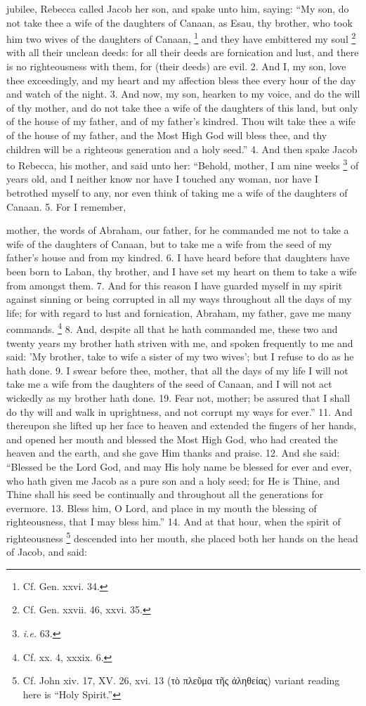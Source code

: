 jubilee, Rebecca called Jacob her son, and spake unto him, saying: ``My son, do not take thee a wife of the daughters of Canaan, as Esau, thy brother, who took him two wives of the daughters of Canaan, \footnote{Cf. Gen. xxvi. 34.} and they have embittered my soul \footnote{Cf. Gen. xxvii. 46, xxvi. 35.} with all their unclean deeds: for all their deeds are fornication and lust, and there is no righteousness with them, for (their deeds) are evil. 2. And I, my son, love thee exceedingly, and my heart and my affection bless thee every hour of the day and watch of the night. 3. And now, my son, hearken to my voice, and do the will of thy mother, and do not take thee a wife of the daughters of this land, but only of the house of my father, and of my father's kindred. Thou wilt take thee a wife of the house of my father, and the Most High God will bless thee, and thy children will be a righteous generation and a holy seed.'' 4. And then spake Jacob to Rebecca, his mother, and said unto her: ``Behold, mother, I am nine weeks \footnote{\emph{i.e.} 63.} of years old, and I neither know nor have I touched any woman, nor have I betrothed myself to any, nor even think of taking me a wife of the daughters of Canaan. 5. For I remember,

mother, the words of Abraham, our father, for he commanded me not to take a wife of the daughters of Canaan, but to take me a wife from the seed of my father's house and from my kindred. 6. I have heard before that daughters have been born to Laban, thy brother, and I have set my heart on them to take a wife from amongst them. 7. And for this reason I have guarded myself in my spirit against sinning or being corrupted in all my ways throughout all the days of my life; for with regard to lust and fornication, Abraham, my father, gave me many commands. \footnote{Cf. xx. 4, xxxix. 6.} 8. And, despite all that he hath commanded me, these two and twenty years my brother hath striven with me, and spoken frequently to me and said: 'My brother, take to wife a sister of my two wives'; but I refuse to do as he hath done. 9. I swear before thee, mother, that all the days of my life I will not take me a wife from the daughters of the seed of Canaan, and I will not act wickedly as my brother hath done. 19. Fear not, mother; be assured that I shall do thy will and walk in uprightness, and not corrupt my ways for ever.'' 11. And thereupon she lifted up her face to heaven and extended the fingers of her hands, and opened her mouth and blessed the Most High God, who had created the heaven and the earth, and she gave Him thanks and praise. 12. And she said: ``Blessed be the Lord God, and may His holy name be blessed for ever and ever, who hath given me Jacob as a pure son and a holy seed; for He is Thine, and Thine shall his seed be continually and throughout all the generations for evermore. 13. Bless him, O Lord, and place in my mouth the blessing of righteousness, that I may bless him.'' 14. And at that hour, when the spirit of righteousness \footnote{Cf. John xiv. 17, XV. 26, xvi. 13 (\textgreek{τὸ πλεῦμα τῆς ἀληθείας}) variant reading here is ``Holy Spirit.''} descended into her mouth, she placed both her hands on the head of Jacob, and said:

